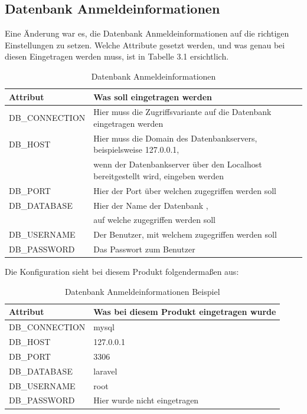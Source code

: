 \subsection{Datenbank Anmeldeinformationen}
Eine Änderung war es, die Datenbank Anmeldeinformationen auf die richtigen Einstellungen zu setzen. Welche Attribute gesetzt werden, und was genau bei diesen Eingetragen werden muss, ist in Tabelle 3.1 ersichtlich.
\begin{table}[h]
	\begin{tabular}{|l|l|}
		\hline
		Attribut         & Was soll eingetragen werden                        \\ \hline
		DB\_CONNECTION     & Hier muss die Zugriffsvariante auf die Datenbank  eingetragen werden                \\ \hline
		DB\_HOST          &  Hier muss die Domain des Datenbankservers, beispielsweise 127.0.0.1,\\& wenn der Datenbankserver über den Localhost bereitgestellt wird, eingeben werden    \\ \hline
		DB\_PORT       & Hier der Port über welchen zugegriffen werden soll \\ \hline
		DB\_DATABASE      & Hier der Name der Datenbank ,\\& auf welche zugegriffen werden soll\\
		DB\_USERNAME   & Der Benutzer, mit welchem zugegriffen werden soll              \\ \hline
		DB\_PASSWORD    & Das Passwort zum Benutzer\\ \hline
	\end{tabular}
\caption{Datenbank Anmeldeinformationen}
\label{sec: Datenbank Anmeldeinformationen}
\end{table}
Die Konfiguration sieht bei diesem Produkt folgendermaßen aus:
\begin{table}[h]
	\begin{tabular}{|l|l|}
		\hline
		Attribut         & Was bei diesem Produkt eingetragen wurde                       \\ \hline
		DB\_CONNECTION     & mysql                 \\ \hline
		DB\_HOST          &  127.0.0.1\\ \hline
		DB\_PORT       & 3306\\ \hline
		DB\_DATABASE      & laravel\\
		DB\_USERNAME   & root             \\ \hline
		DB\_PASSWORD    & Hier wurde nicht eingetragen\\ \hline
	\end{tabular}
	\caption{Datenbank Anmeldeinformationen Beispiel}
	\label{sec: Datenbank Anmeldeinformationen Beispiel}
\end{table}
\newpage
